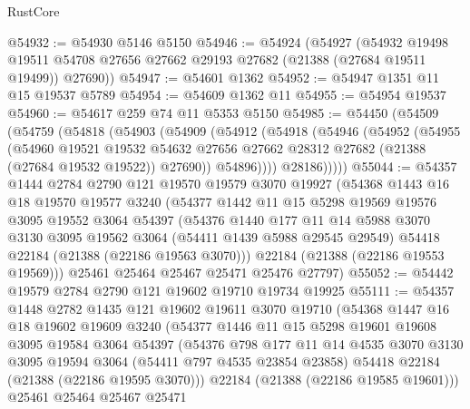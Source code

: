 \begin{lexlean}{RustCore}
\begin{coremodule}
@54932 := @54930 @5146 @5150
@54946 := @54924
    (@54927
      (@54932
        @19498
        @19511
        @54708
        @27656
        @27662
        @29193
        @27682
        (@21388 (@27684 @19511 @19499))
        @27690))
@54947 := @54601 @1362
@54952 := @54947 @1351 @11 @15 @19537 @5789
@54954 := @54609 @1362 @11
@54955 := @54954 @19537
@54960 := @54617 @259 @74 @11 @5353 @5150
@54985 := @54450
    (@54509
      (@54759
        (@54818
          (@54903
            (@54909
              (@54912
                (@54918
                  (@54946
                    (@54952
                      (@54955
                        (@54960
                          @19521
                          @19532
                          @54632
                          @27656
                          @27662
                          @28312
                          @27682
                          (@21388 (@27684 @19532 @19522))
                          @27690))
                      @54896))))
              @28186)))))
@55044 := @54357
    @1444
    @2784
    @2790
    @121
    @19570
    @19579
    @3070
    @19927
    (@54368
      @1443
      @16
      @18
      @19570
      @19577
      @3240
      (@54377
        @1442
        @11
        @15
        @5298
        @19569
        @19576
        @3095
        @19552
        @3064
        @54397
        (@54376
          @1440
          @177
          @11
          @14
          @5988
          @3070
          @3130
          @3095
          @19562
          @3064
          (@54411 @1439 @5988 @29545 @29549)
          @54418
          @22184
          (@21388 (@22186 @19563 @3070)))
        @22184
        (@21388 (@22186 @19553 @19569)))
      @25461
      @25464
      @25467
      @25471
      @25476
      @27797)
@55052 := @54442 @19579 @2784 @2790 @121 @19602 @19710 @19734 @19925
@55111 := @54357
    @1448
    @2782
    @1435
    @121
    @19602
    @19611
    @3070
    @19710
    (@54368
      @1447
      @16
      @18
      @19602
      @19609
      @3240
      (@54377
        @1446
        @11
        @15
        @5298
        @19601
        @19608
        @3095
        @19584
        @3064
        @54397
        (@54376
          @798
          @177
          @11
          @14
          @4535
          @3070
          @3130
          @3095
          @19594
          @3064
          (@54411 @797 @4535 @23854 @23858)
          @54418
          @22184
          (@21388 (@22186 @19595 @3070)))
        @22184
        (@21388 (@22186 @19585 @19601)))
      @25461
      @25464
      @25467
      @25471

\end{coremodule}
\end{lexlean}
